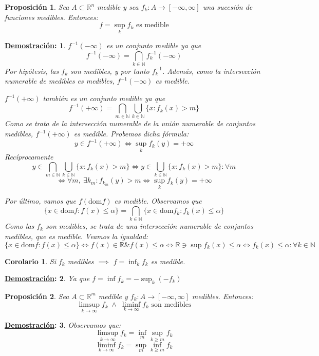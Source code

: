 \documentclass[10pt,a4paper,openright]{book}
\theoremstyle{break}
\newtheorem*{coro}{Corolario}
\newtheorem*{prop}{Proposición}
\newtheorem*{demo}{\underline{Demostración}:}
\begin{document}
\begin{prop}
Sea $A \subset \mathbb{R}^n$ medible y sea $f_k: A \to \left[-\infty, \infty\right]$ una sucesión de funciones medibles. Entonces:
$$f = \sup_k f_k \text{ es medible}$$
\end{prop}
\begin{demo}
$f^{-1}\left(-\infty\right)$ es un conjunto medible ya que $$f^{-1}\left(-\infty\right) = \bigcap_{k \in \mathbb{N}}f^{-1}_k\left(-\infty\right)$$
Por hipótesis, las $f_k$ son medibles, y por tanto $f^{-1}_k$. Además, como la intersección numerable de medibles es medibles, $f^{-1}\left(-\infty\right)$ es medible.

$f^{-1}\left(+\infty\right)$ también es un conjunto medible ya que$$f^{-1}\left(+\infty\right) = \bigcap_{m \in \mathbb{N}}\bigcup_{k \in \mathbb{N}}\{x : f_k \left(x\right) > m\}$$
Como se trata de la intersección numerable de la unión numerable de conjuntos medibles, $f^{-1}\left(+\infty\right)$ es medible. Probemos dicha fórmula:
$$y \in f^{-1}\left(+\infty\right) \iff \sup_k f_k(y) = + \infty$$
Recíprocamente
$$y \in \bigcap_{m \in \mathbb{N}}\bigcup_{k \in \mathbb{N}}\{x : f_k \left(x\right) > m\} \iff y \in \bigcup_{k \in \mathbb{N}}\{x: f_k\left(x\right) > m\} : \forall m$$ 
$$\iff \forall m,\ \exists k_m: f_{k_m}\left(y\right) > m \iff \sup_k f_k\left(y\right) = +\infty$$

Por último, vamos que $f(\mathrm{dom}f)$ es medible. Observamos que  
$$\{x \in \mathrm{dom}f: f\left(x\right) \le \alpha\} = \bigcap_{k \in \mathbb{N}}\{x \in \mathrm{dom} f_k: f_k\left(x\right) \le \alpha\}$$ Como las $f_k$ son medibles, se trata de una intersección numerable de conjuntos medibles, que es medible. Veamos la igualdad:
$$\{x \in \mathrm{dom}f: f\left(x\right) \le \alpha\} \iff f\left(x\right) \in \mathbb{R} \& f\left(x\right) \le \alpha \iff \mathbb{R} \ni \sup f_k\left(x\right) \le \alpha \iff f_k\left(x\right) \le \alpha : \forall k \in \mathbb{N}$$
\end{demo}

\begin{coro}
Si $f_k$ medibles $\implies$ $f = \inf_k f_k$ es medible.
\end{coro}
\begin{demo}
Ya que $f = \inf f_k = -\sup_k \left(-f_k\right)$
\end{demo}

\begin{prop}
Sea $A \subset \mathbb{R}^m$ medible y $f_k: A \to \left[-\infty, \infty\right]$ medibles. Entonces:
$$\limsup_{k \to \infty}f_k\; \land \;\liminf_{k \to \infty}f_k \text{ son medibles}$$
\end{prop}
\begin{demo}
Observamos que:
$$\limsup_{k \to \infty}f_k = \inf_m \sup_{k\ge m} f_k$$
$$\liminf_{k \to \infty}f_k = \sup_m \inf_{k\ge m}f_k$$
\end{demo}
\end{document}
